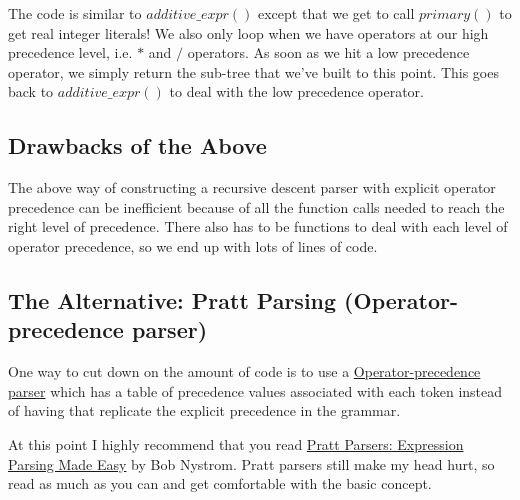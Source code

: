 \documentclass[a4paper,12pt]{article}
\begin{document}
The code is similar to $additive\_expr()$ except that we get to call $primary()$ to get real integer literals! We also only loop when we have operators at our high precedence level, i.e. $*$ and $/$ operators. As soon as we hit a low precedence operator, we simply return the sub-tree that we've built to this point. This goes back to $additive\_expr()$ to deal with the low precedence operator.

\subsection{Drawbacks of the Above}

The above way  of constructing a recursive descent parser with explicit operator precedence can be inefficient because of all the function calls needed to reach the right level of precedence. There also has to be functions to deal with each level of operator precedence, so we end up with lots of lines of code.

\subsection{The Alternative: Pratt Parsing (Operator-precedence parser)}

One way to cut down on the amount of code is to use a \href{https://en.wikipedia.org/wiki/Operator-precedence_parser}{Operator-precedence parser} which has a table of precedence values associated with each token instead of having that replicate the explicit precedence in the grammar.

At this point I highly recommend that you read \href{https://journal.stuffwithstuff.com/2011/03/19/pratt-parsers-expression-parsing-made-easy/}{Pratt Parsers: Expression Parsing Made Easy} by Bob Nystrom. Pratt parsers still make my head hurt, so read as much as you can and get comfortable with the basic concept.
\end{document}
